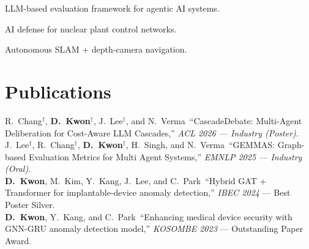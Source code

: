 \documentclass[]{deedy-resume-openfont}
\begin{document}
\begin{minipage}[t]{0.66\textwidth}
 
LLM-based evaluation framework for agentic AI systems.
\sectionsep

 
AI defense for nuclear plant control networks.
\sectionsep

 
Autonomous SLAM + depth-camera navigation.
\sectionsep

\section{Publications}
R.~Chang$^{\dagger}$, \textbf{D.~Kwon}$^{\dagger}$, J.~Lee$^{\dagger}$, and N.~Verma\ ``CascadeDebate: Multi-Agent Deliberation for Cost-Aware LLM Cascades,'' \emph{ACL 2026 --- Industry (Poster)}.\\[0.15em]

J.~Lee$^{\dagger}$, R.~Chang$^{\dagger}$, \textbf{D.~Kwon}$^{\dagger}$, H.~Singh, and N.~Verma\ ``GEMMAS: Graph-based Evaluation Metrics for Multi Agent Systems,'' \emph{EMNLP 2025 --- Industry (Oral)}.\\[0.15em]

\textbf{D.~Kwon}, M.~Kim, Y.~Kang, J.~Lee, and C.~Park\ ``Hybrid GAT + Transformer for implantable-device anomaly detection,'' \emph{IBEC 2024} --- Best Poster Silver.\\[0.15em]

\textbf{D.~Kwon}, Y.~Kang, and C.~Park\ ``Enhancing medical device security with GNN-GRU anomaly detection model,'' \emph{KOSOMBE 2023} --- Outstanding Paper Award.
\end{minipage}
\end{document}
